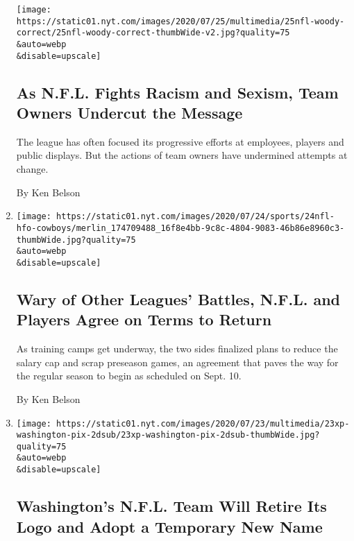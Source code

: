 \begin{enumerate}
  \texttt{[image: https://static01.nyt.com/images/2020/07/25/multimedia/25nfl-woody-correct/25nfl-woody-correct-thumbWide-v2.jpg?quality=75\\\&auto=webp\\\&disable=upscale]}

  \hypertarget{as-nfl-fights-racism-and-sexism-team-owners-undercut-the-message}{%
  \subsection{As N.F.L. Fights Racism and Sexism, Team Owners Undercut
  the
  Message}\label{as-nfl-fights-racism-and-sexism-team-owners-undercut-the-message}}

  The league has often focused its progressive efforts at employees,
  players and public displays. But the actions of team owners have
  undermined attempts at change.

  By Ken Belson
\item
  \href{/2020/07/24/sports/football/nfl-players-regular-season-start.html}{}

  \texttt{[image: https://static01.nyt.com/images/2020/07/24/sports/24nfl-hfo-cowboys/merlin\_174709488\_16f8e4bb-9c8c-4804-9083-46b86e8960c3-thumbWide.jpg?quality=75\\\&auto=webp\\\&disable=upscale]}

  \hypertarget{wary-of-other-leagues-battles-nfl-and-players-agree-on-terms-to-return}{%
  \subsection{Wary of Other Leagues' Battles, N.F.L. and Players Agree
  on Terms to
  Return}\label{wary-of-other-leagues-battles-nfl-and-players-agree-on-terms-to-return}}

  As training camps get underway, the two sides finalized plans to
  reduce the salary cap and scrap preseason games, an agreement that
  paves the way for the regular season to begin as scheduled on Sept.
  10.

  By Ken Belson
\item
  \href{/2020/07/23/sports/football/washington-football-team-name-logo.html}{}

  \texttt{[image: https://static01.nyt.com/images/2020/07/23/multimedia/23xp-washington-pix-2dsub/23xp-washington-pix-2dsub-thumbWide.jpg?quality=75\\\&auto=webp\\\&disable=upscale]}

  \hypertarget{washingtons-nfl-team-will-retire-its-logo-and-adopt-a-temporary-new-name}{%
  \subsection{Washington's N.F.L. Team Will Retire Its Logo and Adopt a
  Temporary New
  Name}\label{washingtons-nfl-team-will-retire-its-logo-and-adopt-a-temporary-new-name}}


\end{enumerate}
